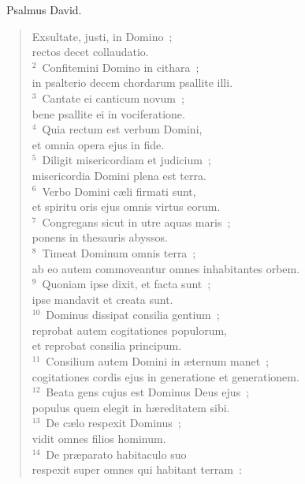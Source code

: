~\lettrine[lines=10,image=true,loversize=0.05,lraise=-0.03]{P}{}salmus David. \begin{flushleft}\begin{verse}\vspace{6pt}Exsultate, justi, in Domino~;\\ rectos decet collaudatio.\\
${}^{2}$~Confitemini Domino in cithara~;\\ in psalterio decem chordarum psallite illi.\\
${}^{3}$~Cantate ei canticum novum~;\\ bene psallite ei in vociferatione.\\
${}^{4}$~Quia rectum est verbum Domini,\\ et omnia opera ejus in fide.\\
${}^{5}$~Diligit misericordiam et judicium~;\\ misericordia Domini plena est terra.\\
${}^{6}$~Verbo Domini c\ae li firmati sunt,\\ et spiritu oris ejus omnis virtus eorum.\\
${}^{7}$~Congregans sicut in utre aquas maris~;\\ ponens in thesauris abyssos.\\
${}^{8}$~Timeat Dominum omnis terra~;\\ ab eo autem commoveantur omnes inhabitantes orbem.\\
${}^{9}$~Quoniam ipse dixit, et facta sunt~;\\ ipse mandavit et creata sunt.\\
${}^{10}$~Dominus dissipat consilia gentium~;\\ reprobat autem cogitationes populorum,\\ et reprobat consilia principum.\\
${}^{11}$~Consilium autem Domini in \ae ternum manet~;\\ cogitationes cordis ejus in generatione et generationem.\\
${}^{12}$~Beata gens cujus est Dominus Deus ejus~;\\ populus quem elegit in h\ae reditatem sibi.\\
${}^{13}$~De c\ae lo respexit Dominus~;\\ vidit omnes filios hominum.\\
${}^{14}$~De pr\ae parato habitaculo suo\\ respexit super omnes qui habitant terram~:\\

\end{verse}
\end{flushleft}
